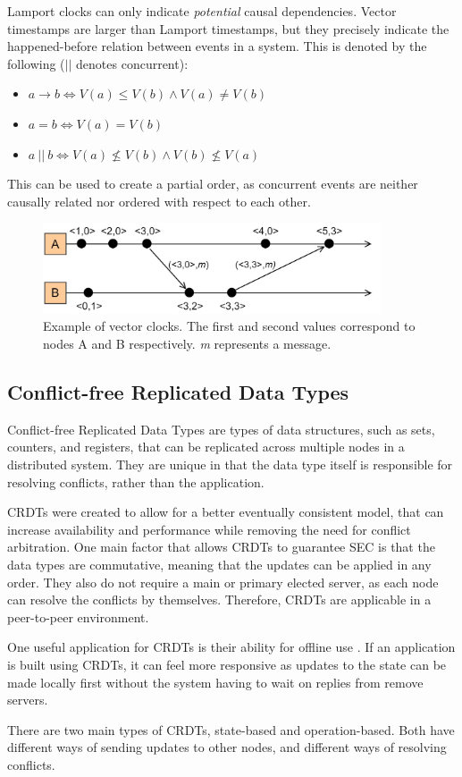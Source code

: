 \documentclass[12pt]{article}
\begin{document}
Lamport clocks can only indicate \emph{potential} causal dependencies. Vector timestamps are larger than Lamport timestamps, but they precisely indicate the happened-before relation between events in a system. This is denoted by the following ($\vert \vert$ denotes concurrent):

\begin{itemize}
    \item $a \rightarrow b \iff V(a) \leq V(b) \land V(a) \not = V(b)$
    \item $a = b \iff V(a) = V(b)$
    \item $a \: || \:  b \iff V(a) \not \leq V(b) \land V(b) \not \leq V(a)$
\end{itemize}

This can be used to create a partial order, as concurrent events are neither causally related nor ordered with respect to each other.

\begin{figure}
    \centering
    \includegraphics[width=10cm]{VectorClocks.jpg}
    \caption{Example of vector clocks. The first and second values correspond to nodes A and B respectively. \textit{m} represents a message.}
    \label{fig:vector}
\end{figure}

\subsection{Conflict-free Replicated Data Types}
Conflict-free Replicated Data Types are types of data structures, such as sets, counters, and registers, that can be replicated across multiple nodes in a distributed system. They are unique in that the data type itself is responsible for resolving conflicts, rather than the application. 

CRDTs were created to allow for a better eventually consistent model, that can increase availability and performance while removing the need for conflict arbitration.  One main factor that allows CRDTs to guarantee SEC is that the data types are commutative\cite{10.1007/978-3-642-24550-3_29}, meaning that the updates can be applied in any order. They also do not require a main or primary elected server, as each node can resolve the conflicts by themselves. Therefore, CRDTs are applicable in a peer-to-peer environment. \par
One useful application for CRDTs is their ability for offline use \cite{10.1145/3359591.3359737}. If an application is built using CRDTs, it can feel more responsive as updates to the state can be made locally first without the system having to wait on replies from remove servers. \par
There are two main types of CRDTs, state-based and operation-based. Both have different ways of sending updates to other nodes, and different ways of resolving conflicts. \par
\end{document}
